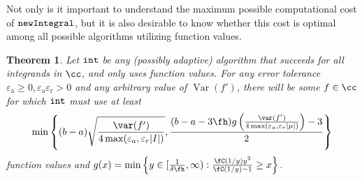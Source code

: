 \documentclass{iitthesis}
\newtheorem{theorem}{Theorem}
\DeclareMathOperator{\newinteg}{\texttt{\textup{newIntegral}}}
\DeclareMathOperator{\goodinteg}{\texttt{\textup{int}}}
\DeclareMathOperator{\Var}{Var}
\newcommand{\hcut}{\fh}
\newcommand{\abstol}{\varepsilon_{\textrm{a}}}
\newcommand{\reltol}{\varepsilon_{\textrm{r}}}
\begin{document}

Not only is it important to understand the maximum possible computational cost of $\newinteg$, but it is also desirable to know whether this cost is optimal among all possible algorithms utilizing function values.

\begin{theorem} \label{conealgolowbdthm}
Let $\goodinteg$ be any (possibly adaptive) algorithm that succeeds for all integrands in $\cc$, and only uses function values.  For any error tolerance $\abstol \ge 0, \abstol\reltol>0 $ and any arbitrary value of $\Var(f')$, there will be some $f \in \cc$ for which $\goodinteg$ must use at least 
\begin{equation} \label{lowbdcone}
\min\left\{(b-a){\sqrt{\frac{\var(f')}{4\max(\varepsilon_{a},\varepsilon_{r}|I|)}}},\frac{(b-a-3\hcut)g\left(\frac{\var(f')}{4\max(\varepsilon_{a},\varepsilon_{r}|\mu|)}\right)-3}{2}\right\}
\end{equation}
function values and $g(x)=\min\left\{y \in[\frac{1}{\delta\hcut},\infty):\frac{\fC(1/y)y^2}{\fC(1/y)-1}\ge x\right\}$.
\end{theorem}
\end{document}
